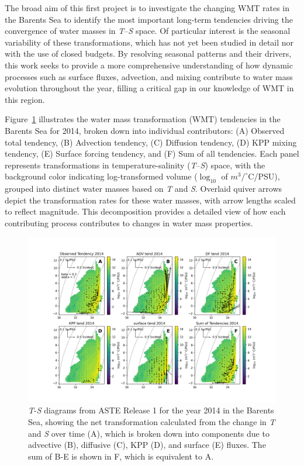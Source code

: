 \documentclass[draft]{agujournal2019}
\begin{document}

The broad aim of this first project is to investigate the changing WMT rates in the Barents Sea to identify the most important long-term tendencies driving the convergence of water masses in \emph{T}--\emph{S} space. Of particular interest is the seasonal variability of these transformations, which has not yet been studied in detail nor with the use of closed budgets. By resolving seasonal patterns and their drivers, this work seeks to provide a more comprehensive understanding of how dynamic processes such as surface fluxes, advection, and mixing contribute to water mass evolution throughout the year, filling a critical gap in our knowledge of WMT in this region.


Figure~\ref{fig:sample_wmt} illustrates the water mass transformation (WMT) tendencies in the Barents Sea for 2014, broken down into individual contributors: (A) Observed total tendency, (B) Advection tendency, (C) Diffusion tendency, (D) KPP mixing tendency, (E) Surface forcing tendency, and (F) Sum of all tendencies. Each panel represents transformations in temperature-salinity (\emph{T}--\emph{S}) space, with the background color indicating log-transformed volume ($\log_{10}$ of $m^3/^\circ$C/PSU), grouped into distinct water masses based on \emph{T} and \emph{S}. Overlaid quiver arrows depict the transformation rates for these water masses, with arrow lengths scaled to reflect magnitude. This decomposition provides a detailed view of how each contributing process contributes to changes in water mass properties.


    \begin{figure} %
    \centering
    \includegraphics[width=\linewidth]{figs/BarentsS_alltend_2014.png}
    \caption{\emph{T}-\emph{S} diagrams from ASTE Release 1 for the year 2014 in the Barents Sea, showing the net transformation calculated from the change in \emph{T} and \emph{S} over time (A), which is broken down into components due to advective (B), diffusive (C), KPP (D), and surface (E) fluxes. The sum of B-E is shown in F, which is equivalent to A.}
    \label{fig:sample_wmt}
    \end{figure}
\end{document}
